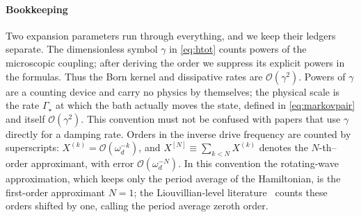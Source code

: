 \documentclass[a4paper,11pt]{article}
\begin{document}
\paragraph{Bookkeeping}
Two expansion parameters run through everything, and we keep their ledgers separate. The dimensionless symbol $\gamma$ in \eqref{eq:htot} counts powers of the microscopic coupling; after deriving the order we suppress its explicit powers in the formulas. Thus the Born kernel and dissipative rates are $\mathcal O(\gamma^2)$. Powers of $\gamma$ are a counting device and carry no physics by themselves; the physical scale is the rate $\Gamma_{\!\star}$ at which the bath actually moves the state, defined in \eqref{eq:markovpair} and itself $\mathcal O(\gamma^2)$. This convention must not be confused with papers that use $\gamma$ directly for a damping rate. Orders in the inverse drive frequency are counted by superscripts: $X^{(k)} = \mathcal O(\omega_d^{-k})$, and $X^{[N]} \equiv \sum_{k<N} X^{(k)}$ denotes the $N$-th--order approximant, with error $\mathcal O(\omega_d^{-N})$. In this convention the rotating-wave approximation, which keeps only the period average of the Hamiltonian, is the first-order approximant $N=1$; the Liouvillian-level literature~\cite{Ikeda2021,Schnell2021} counts these orders shifted by one, calling the period average zeroth order.
\end{document}
